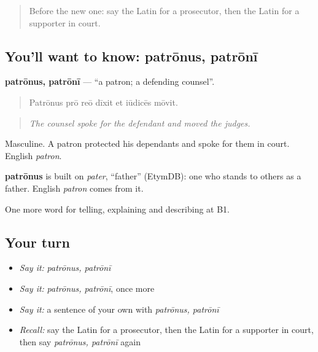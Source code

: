 \label{lesson:LA-C309-patronus}



\begin{quote}
Before the new one: say the Latin for a prosecutor, then the Latin for a supporter in court.
\end{quote}

\subsection*{You'll want to know: patrōnus, patrōnī}
\textbf{patrōnus, patrōnī} — \textquotedblleft{}a patron; a defending counsel\textquotedblright{}.

\begin{quote}
Patrōnus prō reō dīxit et iūdicēs mōvit.
\end{quote}

\begin{quote}
\emph{The counsel spoke for the defendant and moved the judges.}
\end{quote}

Masculine. A patron protected his dependants and spoke for them in court. English \emph{patron}.

\begin{cousinweb}
\textbf{patrōnus} is built on \emph{pater}, \textquotedblleft{}father\textquotedblright{} (EtymDB): one who stands to others as a father. English \emph{patron} comes from it.
\end{cousinweb}

\begin{grammarlens}[title={What you've built}]
One more word for telling, explaining and describing at B1.
\end{grammarlens}

\subsection*{Your turn}
\begin{itemize}
\raggedright
  \item \emph{Say it:} \emph{patrōnus, patrōnī}
  \item \emph{Say it:} \emph{patrōnus, patrōnī}, once more
  \item \emph{Say it:} a sentence of your own with \emph{patrōnus, patrōnī}
  \item \emph{Recall:} say the Latin for a prosecutor, then the Latin for a supporter in court, then say \emph{patrōnus, patrōnī} again
\end{itemize}

